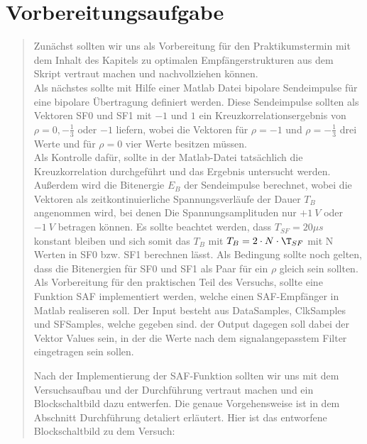 \section{Vorbereitungsaufgabe}
\begin{quote}
	
	Zunächst sollten wir uns als Vorbereitung für den Praktikumstermin mit dem
	Inhalt des Kapitels zu optimalen Empfängerstrukturen aus dem Skript vertraut
	machen und nachvollziehen können.\\
	
	Als nächstes sollte mit Hilfe einer Matlab Datei bipolare Sendeimpulse
	für eine bipolare Übertragung definiert werden. Diese Sendeimpulse sollten als
	Vektoren SF0 und SF1 mit $-1$ und $1$ ein Kreuzkorrelationsergebnis von $\rho
	= 0, -\frac{1}{3}$ oder $-1$ liefern, wobei die Vektoren für $\rho = -1$ und
	$\rho = -\frac{1}{3}$ drei Werte und für $\rho = 0$ vier Werte besitzen
	müssen.\\
	Als Kontrolle dafür, sollte in der Matlab-Datei tatsächlich die
	Kreuzkorrelation durchgeführt und das Ergebnis untersucht werden. Außerdem wird
	die Bitenergie $E_B$ der Sendeimpulse berechnet, wobei die Vektoren als
	zeitkontinuierliche Spannungsverläufe der Dauer $T_B$ angenommen wird, bei
	denen Die Spannungsamplituden nur $+1\ V$ oder $-1\ V$ betragen können.
	Es sollte beachtet werden, dass $T_{SF} = 20\mu s$ konstant bleiben und sich
	somit das $T_B$ mit $T_B = 2 \cdot N \cdot \T_{SF}$ mit N Werten in SF0 bzw.
	SF1 berechnen lässt. Als Bedingung sollte noch gelten, dass die Bitenergien für
	SF0 und SF1 als Paar für ein $\rho$ gleich sein sollten.\\
	
	Als Vorbereitung für den praktischen Teil des Versuchs, sollte eine Funktion
	SAF implementiert werden, welche einen SAF-Empfänger in Matlab realiseren soll.
	Der Input besteht aus DataSamples, ClkSamples und SFSamples, welche gegeben
	sind. der Output dagegen soll dabei der Vektor Values sein, in der die Werte
	nach dem signalangepasstem Filter eingetragen sein sollen.\\
	
	
	Nach der Implementierung der SAF-Funktion sollten wir uns mit dem
	Versuchsaufbau und der Durchführung vertraut machen und  ein Blockschaltbild
	dazu entwerfen. Die genaue Vorgehensweise ist in dem Abschnitt Durchführung
	detaliert erläutert. Hier ist das entworfene Blockschaltbild zu dem Versuch:\\
	

\end{quote}
